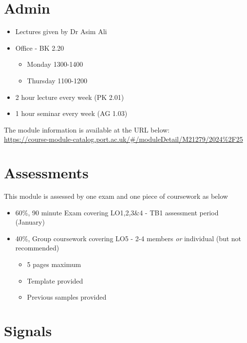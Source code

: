 
\section*{Admin}

\begin{itemize}
  \item Lectures given by Dr Asim Ali
  \item Office - BK 2.20
  \begin{itemize}
    \item Monday 1300-1400
    \item Thursday 1100-1200
  \end{itemize}
  \item 2 hour lecture every week (PK 2.01)
  \item 1 hour seminar every week (AG 1.03)
\end{itemize}

The module information is available at the URL below:\\
\url{https://course-module-catalog.port.ac.uk/#/moduleDetail/M21279/2024\%2F25}

\section*{Assessments}

This module is assessed by one exam and one piece of coursework as below
\begin{itemize}
  \item 60\%, 90 minute Exam covering LO1,2,3\&4 - TB1 assessment period (January)
  \item 40\%, Group coursework covering LO5 - 2-4 members \textit{or} individual (but not recommended)
  \begin{itemize}
    \item 5 pages maximum
    \item Template provided
    \item Previous samples provided
  \end{itemize}
\end{itemize}




\section*{Signals}


